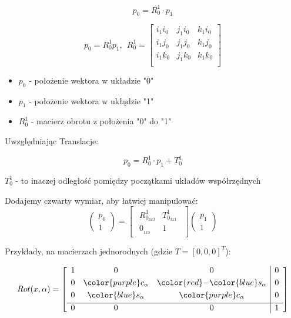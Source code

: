 \documentclass{article}
\begin{document}
\Large
$$
    p_{0} = R_{0}^{1} \cdot p_{1}
$$

$$
	p_0 = R_0^1 p_1
	, \ \
	R_0^1 =
	\left[ \begin{array}{ccc}
		i_1 i_0	& j_1 i_0	& k_1 i_0	\\
		i_1 j_0	& j_1 j_0	& k_1 j_0	\\
		i_1 k_0	& j_1 k_0	& k_1 k_0	\\
	\end{array} \right]
$$

\normalsize

\begin{itemize}
    \item $p_{0}$ - położenie wektora w układzie "0"
    \item $p_{1}$ - położenie wektora w ukłądzie "1"
    \item $R_{0}^{1}$ - macierz obrotu z położenia "0" do "1"
\end{itemize}

Uwzględniając Translacje:

\Large
$$
    p_{0} = R_{0}^{1} \cdot p_{1} + T_{0}^{1}
$$
\normalsize

$T_{0}^{1}$ - to inaczej odległość pomiędzy początkami układów współrzędnych

Dodajemy czwarty wymiar, aby łatwiej manipulować:
\Large
$$
    \begin{pmatrix}
        p_{0} \\
        1
    \end{pmatrix}
    =
    \begin{bmatrix}
        \begin{array}{c|c}
            R_{0_{3x3}}^{1} & T_{0_{3x1}}^{1} \\[0.3em]
            \hline
            0_{_{1x3}}      & 1
        \end{array}
    \end{bmatrix}
    \begin{pmatrix}
        p_{1} \\
        1
    \end{pmatrix}
$$
\normalsize

\newpage

Przykłady, na macierzach jednorodnych (gdzie $T = \left[0, 0, 0\right]^{T}$):



\Large
$$
    Rot(x, \alpha) =
    \begin{bmatrix}
        \begin{array}{ccc|c}
            1 & 0                           & 0                                       & 0 \\[0.3em]
            0 & {\color{purple} c_{\alpha}} & {\color{red}-}{\color{blue} s_{\alpha}} & 0 \\[0.3em]
            0 & {\color{blue} s_{\alpha}}   & {\color{purple} c_{\alpha}}             & 0 \\[0.3em]
            \hline
            0 & 0                           & 0                                       & 1
        \end{array}
    \end{bmatrix}
$$
\normalsize
\end{document}
